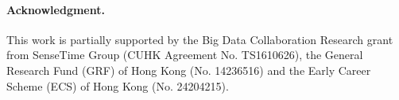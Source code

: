 \documentclass[10pt,twocolumn,letterpaper]{article}
\begin{document}
\paragraph{Acknowledgment.} This work is partially supported by the Big Data Collaboration Research grant from SenseTime Group (CUHK Agreement No. TS1610626), the General Research Fund (GRF) of Hong Kong (No. 14236516) and the Early Career Scheme (ECS) of Hong Kong (No. 24204215).
 

{\small
	
	
}
\end{document}

